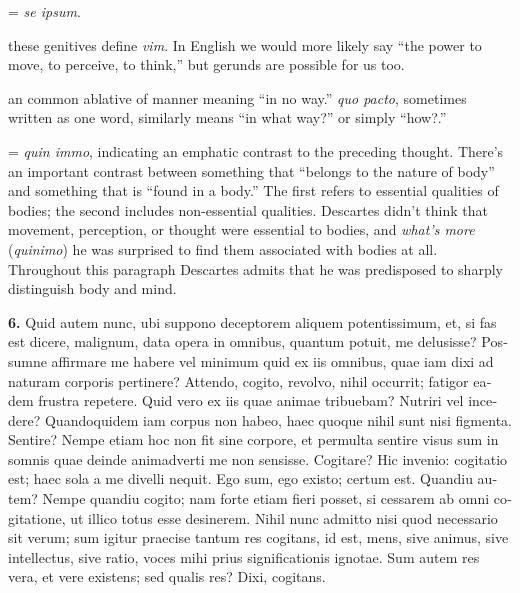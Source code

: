  = \textit{se ipsum}.

 these genitives define \textit{vim}. In English we would more likely say ``the power to move, to perceive, to think,'' but gerunds are possible for us too.

 an common ablative of manner meaning ``in no way.'' \textit{quo pacto}, sometimes written as one word, similarly means ``in what way?'' or simply ``how?.''

 = \textit{quin immo}, indicating an emphatic contrast to the preceding thought. There's an important contrast between something that ``belongs to the nature of body'' and something that is ``found in a body.'' The first refers to essential qualities of bodies; the second includes non-essential qualities. Descartes didn't think that movement, perception, or thought were essential to bodies, and \textit{what's more} (\textit{quinimo}) he was surprised to find them associated with bodies at all. Throughout this paragraph Descartes admits that he was predisposed to sharply distinguish body and mind.

\clearpage

\beginnumbering
\pstart
\begin{latin}
    \textenglish{\textbf{6.}} Quid autem nunc, ubi suppono deceptorem aliquem potentissimum, et, si fas est dicere, malignum, data opera in omnibus, quantum potuit, me delusisse? Possumne affirmare me habere vel minimum quid ex iis omnibus, quae iam dixi ad naturam corporis pertinere? Attendo, cogito, revolvo, nihil occurrit; fatigor eadem frustra repetere. Quid vero ex iis quae animae tribuebam? Nutriri vel incedere? Quandoquidem iam corpus non habeo, haec quoque nihil sunt nisi figmenta. Sentire? Nempe etiam hoc non fit sine corpore, et permulta sentire visus sum in somnis quae deinde animadverti me non sensisse. Cogitare? Hic invenio: cogitatio est; haec sola a me divelli nequit. Ego sum, ego existo; certum est. Quandiu autem? Nempe quandiu cogito; nam forte etiam fieri posset, si cessarem ab omni cogitatione, ut illico totus esse desinerem. Nihil nunc admitto nisi quod necessario sit verum; sum igitur praecise tantum res cogitans, id est, mens, sive animus, sive intellectus, sive ratio, voces mihi prius significationis ignotae. Sum autem res vera, et vere existens; sed qualis res? Dixi, cogitans.
\end{latin}
\pend
\endnumbering

